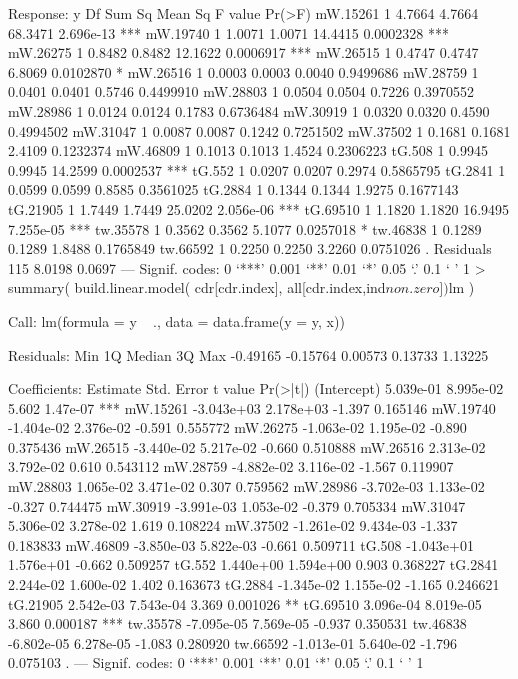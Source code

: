 Response: y
           Df Sum Sq Mean Sq F value    Pr(>F)    
mW.15261    1 4.7664  4.7664 68.3471 2.696e-13 ***
mW.19740    1 1.0071  1.0071 14.4415 0.0002328 ***
mW.26275    1 0.8482  0.8482 12.1622 0.0006917 ***
mW.26515    1 0.4747  0.4747  6.8069 0.0102870 *  
mW.26516    1 0.0003  0.0003  0.0040 0.9499686    
mW.28759    1 0.0401  0.0401  0.5746 0.4499910    
mW.28803    1 0.0504  0.0504  0.7226 0.3970552    
mW.28986    1 0.0124  0.0124  0.1783 0.6736484    
mW.30919    1 0.0320  0.0320  0.4590 0.4994502    
mW.31047    1 0.0087  0.0087  0.1242 0.7251502    
mW.37502    1 0.1681  0.1681  2.4109 0.1232374    
mW.46809    1 0.1013  0.1013  1.4524 0.2306223    
tG.508      1 0.9945  0.9945 14.2599 0.0002537 ***
tG.552      1 0.0207  0.0207  0.2974 0.5865795    
tG.2841     1 0.0599  0.0599  0.8585 0.3561025    
tG.2884     1 0.1344  0.1344  1.9275 0.1677143    
tG.21905    1 1.7449  1.7449 25.0202 2.056e-06 ***
tG.69510    1 1.1820  1.1820 16.9495 7.255e-05 ***
tw.35578    1 0.3562  0.3562  5.1077 0.0257018 *  
tw.46838    1 0.1289  0.1289  1.8488 0.1765849    
tw.66592    1 0.2250  0.2250  3.2260 0.0751026 .  
Residuals 115 8.0198  0.0697                      
---
Signif. codes:  0 ‘***’ 0.001 ‘**’ 0.01 ‘*’ 0.05 ‘.’ 0.1 ‘ ’ 1
> summary(  build.linear.model( cdr[cdr.index], all[cdr.index,ind$non.zero])$lm )

Call:
lm(formula = y ~ ., data = data.frame(y = y, x))

Residuals:
     Min       1Q   Median       3Q      Max 
-0.49165 -0.15764  0.00573  0.13733  1.13225 

Coefficients:
              Estimate Std. Error t value Pr(>|t|)    
(Intercept)  5.039e-01  8.995e-02   5.602 1.47e-07 ***
mW.15261    -3.043e+03  2.178e+03  -1.397 0.165146    
mW.19740    -1.404e-02  2.376e-02  -0.591 0.555772    
mW.26275    -1.063e-02  1.195e-02  -0.890 0.375436    
mW.26515    -3.440e-02  5.217e-02  -0.660 0.510888    
mW.26516     2.313e-02  3.792e-02   0.610 0.543112    
mW.28759    -4.882e-02  3.116e-02  -1.567 0.119907    
mW.28803     1.065e-02  3.471e-02   0.307 0.759562    
mW.28986    -3.702e-03  1.133e-02  -0.327 0.744475    
mW.30919    -3.991e-03  1.053e-02  -0.379 0.705334    
mW.31047     5.306e-02  3.278e-02   1.619 0.108224    
mW.37502    -1.261e-02  9.434e-03  -1.337 0.183833    
mW.46809    -3.850e-03  5.822e-03  -0.661 0.509711    
tG.508      -1.043e+01  1.576e+01  -0.662 0.509257    
tG.552       1.440e+00  1.594e+00   0.903 0.368227    
tG.2841      2.244e-02  1.600e-02   1.402 0.163673    
tG.2884     -1.345e-02  1.155e-02  -1.165 0.246621    
tG.21905     2.542e-03  7.543e-04   3.369 0.001026 ** 
tG.69510     3.096e-04  8.019e-05   3.860 0.000187 ***
tw.35578    -7.095e-05  7.569e-05  -0.937 0.350531    
tw.46838    -6.802e-05  6.278e-05  -1.083 0.280920    
tw.66592    -1.013e-01  5.640e-02  -1.796 0.075103 .  
---
Signif. codes:  0 ‘***’ 0.001 ‘**’ 0.01 ‘*’ 0.05 ‘.’ 0.1 ‘ ’ 1

